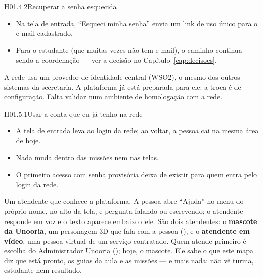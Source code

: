 \begin{historia}{H01.4.2}{Recuperar a senha esquecida}{\afazer}
\aceiteproposta
\begin{itemize}
  \item Na tela de entrada, \enquote{Esqueci minha senha} envia um link de uso
    único para o e-mail cadastrado.
  \item Para o estudante (que muitas vezes não tem e-mail), o caminho continua
    sendo a coordenação --- ver a decisão  no
    Capítulo~\ref{cap:decisoes}.
\end{itemize}
\end{historia}


A rede usa um provedor de identidade central (WSO2), o mesmo dos outros
sistemas da secretaria. A plataforma já está preparada para ele: a troca é de
configuração. Falta validar num ambiente de homologação com a rede.

\begin{historia}{H01.5.1}{Usar a conta que eu já tenho na rede}{\afazer}
\aceiteproposta
\begin{itemize}
  \item A tela de entrada leva ao login da rede; ao voltar, a pessoa cai na
    mesma área de hoje.
  \item Nada muda dentro das missões nem nas telas.
  \item O primeiro acesso com senha provisória deixa de existir para quem
    entra pelo login da rede.
\end{itemize}
\end{historia}


Um atendente que conhece a plataforma. A pessoa abre
\enquote{Ajuda} no menu do próprio nome, no alto da tela, e pergunta falando
ou escrevendo; o atendente responde em voz e o texto aparece embaixo dele.
São dois atendentes: o \textbf{mascote da Unooria}, um personagem 3D que fala
com a pessoa (), e o \textbf{atendente em vídeo}, uma pessoa
virtual de um serviço contratado. Quem atende primeiro é escolha do
Administrador Unooria (); hoje, o mascote.
Ele sabe o que este mapa diz que está pronto, os guias da aula e as missões
--- e mais nada: não vê turma, estudante nem resultado.

